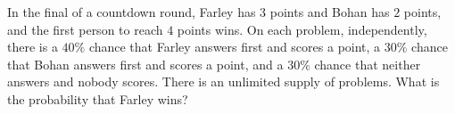 In the final of a countdown round, Farley has $3$ points and Bohan has $2$ points, and the first person to reach $4$ points wins. On each problem, independently, there is a $40\%$ chance that Farley answers first and scores a point, a $30\%$ chance that Bohan answers first and scores a point, and a $30\%$ chance that neither answers and nobody scores. There is an unlimited supply of problems. What is the probability that Farley wins?
